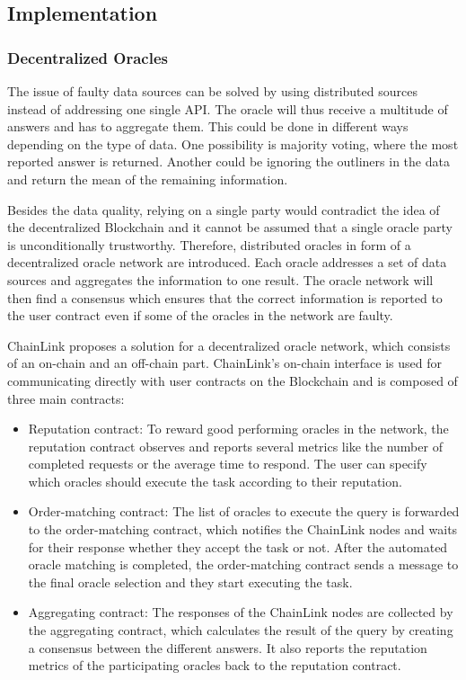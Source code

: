 \documentclass[conference]{IEEEtran}
\begin{document}
\subsection{Implementation}
\subsubsection{Decentralized Oracles}
The issue of faulty data sources can be solved by using distributed sources instead of addressing one single API. The oracle will thus receive a multitude of answers and has to aggregate them. This could be done in different ways depending on the type of data. One possibility is majority voting, where the most reported answer is returned. Another could be ignoring the outliners in the data and return the mean of the remaining information. \cite{Ellis2017} \par 
Besides the data quality, relying on a single party would contradict the idea of the decentralized Blockchain and it cannot be assumed that a single oracle party is unconditionally trustworthy. Therefore, distributed oracles in form of a decentralized oracle network are introduced. Each oracle addresses a set of data sources and aggregates the information to one result. The oracle network will then find a consensus which ensures that the correct information is reported to the user contract even if some of the oracles in the network are faulty. \cite{Ellis2017} \par 
ChainLink proposes a solution for a decentralized oracle network, which consists of an on-chain and an off-chain part. ChainLink's on-chain interface is used for communicating directly with user contracts on the Blockchain and is composed of three main contracts:
\begin{itemize}
	\item Reputation contract: To reward good performing oracles in the network, the reputation contract observes and reports several metrics like the number of completed requests or the average time to respond. The user can specify which oracles should execute the task according to their reputation.
	\item Order-matching contract: The list of oracles to execute the query is forwarded to the order-matching contract, which notifies the ChainLink nodes and waits for their response whether they accept the task or not. After the automated oracle matching is completed, the order-matching contract sends a message to the final oracle selection and they start executing the task.
	\item Aggregating contract: The responses of the ChainLink nodes are collected by the aggregating contract, which calculates the result of the query by creating a consensus between the different answers. It also reports the reputation metrics of the participating oracles back to the reputation contract. \cite{Ellis2017}   
\end{itemize}
\end{document}

